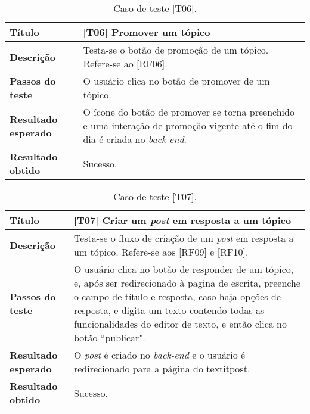 \begin{table}[hbt!]
    \centering
    \begin{tabularx}{0.9\textwidth}{l|X}
    \hline
    \textbf {Título} & [T06] Promover um tópico \\\hline
    \textbf {Descrição} & Testa-se o botão de promoção de um tópico. Refere-se ao [RF06]. \\ \hline
    \textbf {Passos do teste} & O usuário clica no botão de promover de um tópico. \\ \hline
    \textbf {Resultado esperado}& O ícone do botão de promover se torna preenchido e uma interação de promoção vigente até o fim do dia é criada no \textit{back-end}. \\ \hline
    \textbf {Resultado obtido} & Sucesso. \\ \hline
    \end{tabularx}
    \caption{Caso de teste [T06].}
\end{table}

\begin{table}[hbt!]
    \centering
    \begin{tabularx}{0.9\textwidth}{l|X}
    \hline
    \textbf {Título} & [T07] Criar um \textit{post} em resposta a um tópico \\\hline
    \textbf {Descrição} & Testa-se o fluxo de criação de um \textit{post} em resposta a um tópico. Refere-se aos [RF09] e [RF10]. \\ \hline
    \textbf {Passos do teste} & O usuário clica no botão de responder de um tópico, e, após ser redirecionado à pagina de escrita, preenche o campo de título e resposta, caso haja opções de resposta, e digita um texto contendo todas as funcionalidades do editor de texto, e então clica no botão “publicar". \\ \hline
    \textbf {Resultado esperado}& O \textit{post} é criado no \textit{back-end} e o usuário é redirecionado para a página do textit{post}. \\ \hline
    \textbf {Resultado obtido} & Sucesso. \\ \hline
    \end{tabularx}
    \caption{Caso de teste [T07].}
\end{table}


